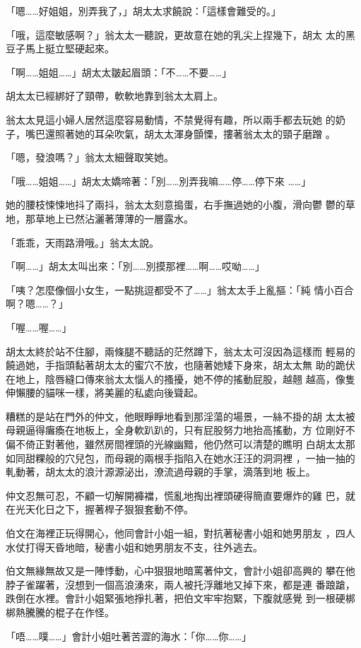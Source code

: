 「嗯……好姐姐，別弄我了，」胡太太求饒說：「這樣會難受的。」

「哦，這麼敏感啊？」翁太太一聽說，更故意在她的乳尖上捏幾下，胡太
太的黑豆子馬上挺立堅硬起來。

「啊……姐姐……」胡太太皺起眉頭：「不……不要……」

胡太太已經綁好了頸帶，軟軟地靠到翁太太肩上。

翁太太見這小婦人居然這麼容易動情，不禁覺得有趣，所以兩手都去玩她
的奶子，嘴巴還照著她的耳朵吹氣，胡太太渾身顫慄，摟著翁太太的頸子磨蹭
。

「嗯，發浪嗎？」翁太太細聲取笑她。

「哦……姐姐……」胡太太嬌啼著：「別……別弄我嘛……停……停下來
……」

她的腰枝悚悚地抖了兩抖，翁太太刻意搗蛋，右手撫過她的小腹，滑向鬱
鬱的草地，那草地上已然沾灑著薄薄的一層露水。

「乖乖，天雨路滑哦。」翁太太說。

「啊……」胡太太叫出來：「別……別摸那裡……啊……哎呦……」

「咦？怎麼像個小女生，一點挑逗都受不了……」翁太太手上亂摳：「純
情小百合啊？嗯……？」

「喔……喔……」

胡太太終於站不住腳，兩條腿不聽話的茫然蹲下，翁太太可沒因為這樣而
輕易的饒過她，手指頭黏著胡太太的蜜穴不放，也隨著她矮下身來，胡太太無
助的跪伏在地上，陰唇縫口傳來翁太太惱人的搔擾，她不停的搖動屁股，越翹
越高，像隻伸懶腰的貓咪一樣，將美麗的私處向後聳起。

糟糕的是站在門外的仲文，他眼睜睜地看到那淫蕩的場景，一絲不掛的胡
太太被母親逼得癱瘓在地板上，全身軟趴趴的，只有屁股努力地抬高搖動，方
位剛好不偏不倚正對著他，雖然房間裡頭的光線幽黯，他仍然可以清楚的瞧明
白胡太太那如同甜粿般的穴兒包，而母親的兩根手指陷入在她水汪汪的洞洞裡
，一抽一抽的軋動著，胡太太的浪汁源源泌出，潦流過母親的手掌，滴落到地
板上。

仲文忍無可忍，不顧一切解開褲襠，慌亂地掏出裡頭硬得簡直要爆炸的雞
巴，就在光天化日之下，握著桿子狠狠套動不停。

伯文在海裡正玩得開心，他同會計小姐一組，對抗著秘書小姐和她男朋友
，四人水仗打得天昏地暗，秘書小姐和她男朋友不支，往外逃去。

伯文無緣無故又是一陣悸動，心中狠狠地暗罵著仲文，會計小姐卻高興的
攀在他脖子雀躍著，沒想到一個高浪湧來，兩人被托浮離地又掉下來，都是連
番踉蹌，跌倒在水裡。會計小姐緊張地掙扎著，把伯文牢牢抱緊，下腹就感覺
到一根硬梆梆熱騰騰的棍子在作怪。

「唔……噗……」會計小姐吐著苦澀的海水：「你……你……」

